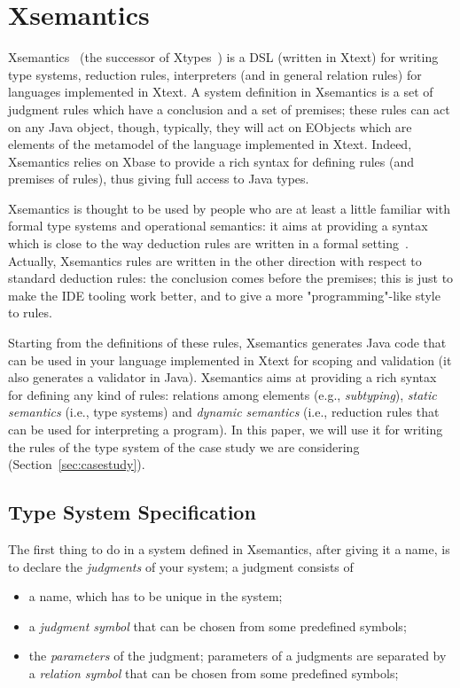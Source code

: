 \section{Xsemantics}
\label{sec:xsemantics}

Xsemantics~\cite{lbts} (the successor of Xtypes~\cite{Bet11}) is a DSL (written
in Xtext) for writing type systems, reduction rules, interpreters (and in
general relation rules) for languages implemented in Xtext.
A system definition in Xsemantics is a set of judgment rules which have a
conclusion and a set of premises; these rules can act on any Java object,
though, typically, they will act on EObjects which are elements of the metamodel
of the language implemented in Xtext.  Indeed, Xsemantics relies on Xbase to
provide a rich syntax for defining rules (and premises of rules), thus giving
full access to Java types.

Xsemantics is thought to be used by people who are at least a little familiar
with formal type systems and operational semantics: it aims at providing
a syntax which is close to the way deduction rules are written in a formal
setting~\cite{hindley:1997a,Pierce02}.
Actually, Xsemantics rules are written in the other direction with respect
to standard deduction rules: the conclusion comes before the premises; this is
just to make the IDE tooling work better, and to give a more "programming"-like
style to rules.

Starting from the definitions of these rules, Xsemantics generates Java code
that can be used in your language implemented in Xtext for scoping and
validation (it also generates a validator in Java).  Xsemantics aims at
providing a rich syntax for defining any kind of rules: relations among elements
(e.g., \emph{subtyping}), \emph{static semantics} (i.e., type systems) and
\emph{dynamic semantics} (i.e., reduction rules that can be used for
interpreting a program).  In this paper, we will use it for writing the rules of
the type system of the case study we are considering
(Section~\ref{sec:casestudy}).

\subsection{Type System Specification}

The first thing to do in a system defined in Xsemantics, after giving it a name,
is to declare the \emph{judgments} of your system; a judgment consists of

\begin{itemize}
\item 
a name, which has to be unique in the system;
\item 
a \textit{judgment symbol} that can be chosen from some predefined symbols;
\item 
the \textit{parameters} of the judgment; parameters of a judgments are separated by
	a \textit{relation symbol} that can be chosen from some predefined symbols;
\end{itemize}

